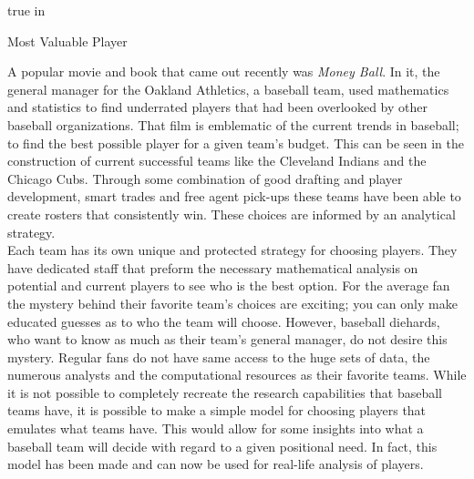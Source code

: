 \documentclass[12pt]{article}
\newcommand\tab[1][1cm]{\hspace*{#1}}
\begin{document}
\begin{doublespace}
 true in
\end{doublespace}

\vskip 12pt

\centerline{Most Valuable Player}

\vskip 12pt
	\tab A popular movie and book that came out recently was \textit{Money Ball}.  In it, the general manager for the Oakland Athletics, a baseball team, used mathematics and statistics to find underrated players that had been overlooked by other baseball organizations.  That film is emblematic of the current trends in baseball; to find the best possible player for a given team's budget.  This can be seen in the construction of current successful teams like the Cleveland Indians and the Chicago Cubs.  Through some combination of good drafting and player development, smart trades and free agent pick-ups these teams have been able to create rosters that consistently win.  These choices are informed by an analytical strategy.  \\
	\tab Each team has its own unique and protected strategy for choosing players.  They have dedicated staff that preform the necessary mathematical analysis on potential and current players to see who is the best option.  For the average fan the mystery behind their favorite team's choices are exciting; you can only make educated guesses as to who the team will choose.  However, baseball diehards, who want to know as much as their team's general manager, do not desire this mystery.  Regular fans do not have same access to the huge sets of data, the numerous analysts and the computational resources as their favorite teams.  While it is not possible to completely recreate the research capabilities that baseball teams have, it is possible to make a simple model for choosing players that emulates what teams have.  This would allow for some insights into what a baseball team will decide with regard to a given positional need.  In fact, this model has been made and can now be used for real-life analysis of players.  \\
\end{document}
